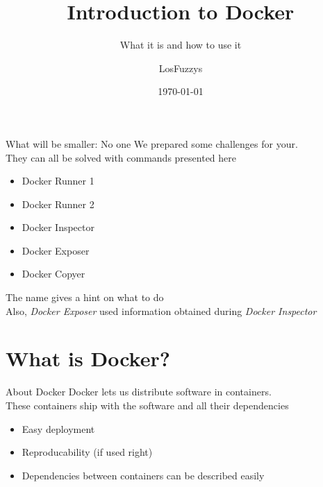 \documentclass[12pt]{beamer}
\title{Introduction to Docker}
\subtitle{What it is and how to use it}
\date{\today}
\author{LosFuzzys}
\begin{document}
\maketitle


\begin{frame}[fragile]{What will be smaller: No one}
    We prepared some challenges for your. \\
    They can all be solved with commands presented here
    \begin{itemize}[label=\textcolor{black}{\textbullet}]
        \item Docker Runner 1
        \item Docker Runner 2
        \item Docker Inspector
        \item Docker Exposer
        \item Docker Copyer
    \end{itemize}
    The name gives a hint on what to do\\
    Also, \emph{Docker Exposer} used information obtained during \emph{Docker Inspector}
\end{frame}

\section{What is Docker?}

\begin{frame}{About Docker}
    Docker lets us distribute software in containers. \\
    These containers ship with the software and all their dependencies
    \begin{itemize}
        \item Easy deployment
        \item Reproducability (if used right)
        \item Dependencies between containers can be described easily
    \end{itemize}
\end{frame}
\end{document}
